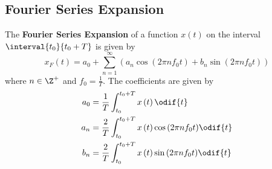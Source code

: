 \documentclass{article}
\begin{document}
\subsection{Fourier Series Expansion}
The \textbf{Fourier Series Expansion} of a function \(x\left( t \right)\) on the interval \(\interval{t_0}{t_0 + T}\)
is given by
\begin{equation*}
    x_F\left( t \right) = a_0 + \sum_{n = 1}^\infty \left( a_n \cos{\left( 2\pi n f_0 t \right)} + b_n \sin{\left( 2\pi n f_0 t \right)} \right)
\end{equation*}
where \(n \in \Z^{+}\) and \(f_0 = \frac{1}{T}\). The coefficients are given by
\begin{align*}
    a_0 & = \frac{1}{T} \int_{t_0}^{t_0 + T} x\left( t \right) \odif{t}                                   \\
    a_n & = \frac{2}{T} \int_{t_0}^{t_0 + T} x\left( t \right) \cos{\left( 2\pi n f_0 t \right)} \odif{t} \\
    b_n & = \frac{2}{T} \int_{t_0}^{t_0 + T} x\left( t \right) \sin{\left( 2\pi n f_0 t \right)} \odif{t}
\end{align*}
\end{document}
